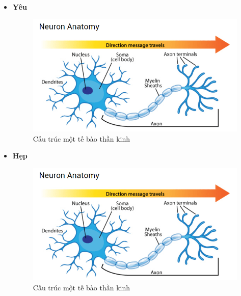 \documentclass[12pt,a4paper,oneside]{book}
\numberwithin{equation}{chapter} %
\numberwithin{figure}{chapter} %
\numberwithin{table}{chapter} %
\begin{document}
\begin{itemize}
\item \textbf{Yêu}
\FloatBarrier
\begin{figure}[htp]
\begin{center}
\includegraphics[scale=0.8]{chap2/c2_figs/neuron.png}
\end{center}
\caption{Cấu trúc một tế bào thần kinh}
\label{fig:neuronsinhhoc}
\end{figure}
\FloatBarrier

\item \textbf{Hẹp}
\FloatBarrier
\begin{figure}[htp]
\begin{center}
\includegraphics[scale=0.8]{chap2/c2_figs/neuron.png}
\end{center}
\caption{Cấu trúc một tế bào thần kinh}
\label{fig:neuronsinhhoc}
\end{figure}
\FloatBarrier


\end{itemize}
\end{document}
